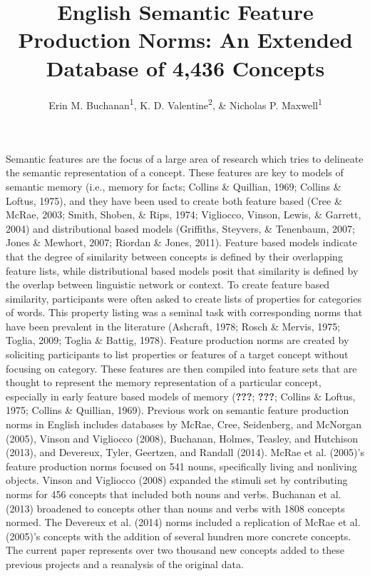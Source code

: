 \documentclass[english,,man]{apa6}
\title{English Semantic Feature Production Norms: An Extended Database of 4,436
Concepts}
\author{Erin M. Buchanan\textsuperscript{1}, K. D. Valentine\textsuperscript{2},
\& Nicholas P. Maxwell\textsuperscript{1}}
\date{}
\affiliation{
\vspace{0.5cm}
\textsuperscript{1} Missouri State University\\\textsuperscript{2} University of Missouri}
\theoremstyle{definition}
\theoremstyle{definition}
\theoremstyle{definition}
\theoremstyle{remark}
\begin{document}
\maketitle

Semantic features are the focus of a large area of research which tries
to delineate the semantic representation of a concept. These features
are key to models of semantic memory (i.e., memory for facts; Collins \&
Quillian, 1969; Collins \& Loftus, 1975), and they have been used to
create both feature based (Cree \& McRae, 2003; Smith, Shoben, \& Rips,
1974; Vigliocco, Vinson, Lewis, \& Garrett, 2004) and distributional
based models (Griffiths, Steyvers, \& Tenenbaum, 2007; Jones \& Mewhort,
2007; Riordan \& Jones, 2011). Feature based models indicate that the
degree of similarity between concepts is defined by their overlapping
feature lists, while distributional based models posit that similarity
is defined by the overlap between linguistic network or context. To
create feature based similarity, participants were often asked to create
lists of properties for categories of words. This property listing was a
seminal task with corresponding norms that have been prevalent in the
literature (Ashcraft, 1978; Rosch \& Mervis, 1975; Toglia, 2009; Toglia
\& Battig, 1978). Feature production norms are created by soliciting
participants to list properties or features of a target concept without
focusing on category. These features are then compiled into feature sets
that are thought to represent the memory representation of a particular
concept, especially in early feature based models of memory
({\textbf{???}}; {\textbf{???}}; Collins \& Loftus, 1975; Collins \&
Quillian, 1969). Previous work on semantic feature production norms in
English includes databases by McRae, Cree, Seidenberg, and McNorgan
(2005), Vinson and Vigliocco (2008), Buchanan, Holmes, Teasley, and
Hutchison (2013), and Devereux, Tyler, Geertzen, and Randall (2014).
McRae et al. (2005)'s feature production norms focused on 541 nouns,
specifically living and nonliving objects. Vinson and Vigliocco (2008)
expanded the stimuli set by contributing norms for 456 concepts that
included both nouns and verbs. Buchanan et al. (2013) broadened to
concepts other than nouns and verbs with 1808 concepts normed. The
Devereux et al. (2014) norms included a replication of McRae et al.
(2005)'s concepts with the addition of several hundren more concrete
concepts. The current paper represents over two thousand new concepts
added to these previous projects and a reanalysis of the original data.
\end{document}
